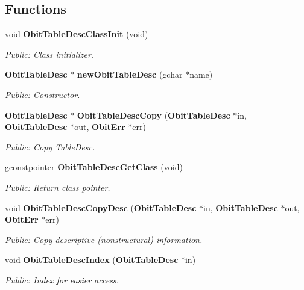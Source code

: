 \subsection*{Functions}
\begin{CompactItemize}
\item 
void {\bf Obit\-Table\-Desc\-Class\-Init} (void)
\begin{CompactList}\small\item\em Public: Class initializer. \item\end{CompactList}\item 
{\bf Obit\-Table\-Desc} $\ast$ {\bf new\-Obit\-Table\-Desc} (gchar $\ast$name)
\begin{CompactList}\small\item\em Public: Constructor. \item\end{CompactList}\item 
{\bf Obit\-Table\-Desc} $\ast$ {\bf Obit\-Table\-Desc\-Copy} ({\bf Obit\-Table\-Desc} $\ast$in, {\bf Obit\-Table\-Desc} $\ast$out, {\bf Obit\-Err} $\ast$err)
\begin{CompactList}\small\item\em Public: Copy Table\-Desc. \item\end{CompactList}\item 
gconstpointer {\bf Obit\-Table\-Desc\-Get\-Class} (void)
\begin{CompactList}\small\item\em Public: Return class pointer. \item\end{CompactList}\item 
void {\bf Obit\-Table\-Desc\-Copy\-Desc} ({\bf Obit\-Table\-Desc} $\ast$in, {\bf Obit\-Table\-Desc} $\ast$out, {\bf Obit\-Err} $\ast$err)
\begin{CompactList}\small\item\em Public: Copy descriptive (nonstructural) information. \item\end{CompactList}\item 
void {\bf Obit\-Table\-Desc\-Index} ({\bf Obit\-Table\-Desc} $\ast$in)
\begin{CompactList}\small\item\em Public: Index for easier access. \item\end{CompactList}\item 

\end{CompactItemize}
